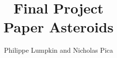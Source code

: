 \documentclass[10pt,conference,onecolumn,compsoc]{IEEEtran}
\begin{document}
%
\title{Final Project\\ Paper Asteroids}
%
%
%
%

\author{ Philippe Lumpkin and Nicholas Pica\\%
}

% 
%
\end{document}
